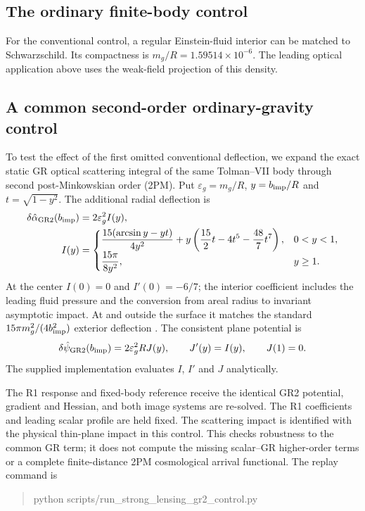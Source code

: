 \subsection{The ordinary finite-body control}
For the conventional control, a regular Einstein-fluid interior can be
matched to Schwarzschild. Its compactness is
$m_g/R=1.59514\times10^{-6}$.
The leading optical application above uses the weak-field projection of
this density.

\subsection{A common second-order ordinary-gravity control}
\label{sec:gr2-method}
To test the effect of the first omitted conventional deflection, we
expand the exact static GR optical scattering integral of the same
Tolman--VII body through second post-Minkowskian order (2PM).
Put $\varepsilon_g=m_g/R$, $y=b_{\rm imp}/R$ and
$t=\sqrt{1-y^2}$. The additional radial deflection is
\begin{align}
 \delta\hat\alpha_{\rm GR2}(b_{\rm imp})&=2\varepsilon_g^2 I(y),
 \label{eq:gr2-alpha}\\
 I(y)&=\begin{cases}
 \displaystyle\frac{15(\arcsin y-yt)}{4y^2}
 +y\left(\frac{15}{2}t-4t^5-\frac{48}{7}t^7\right),&0<y<1,\\[4pt]
 \displaystyle\frac{15\pi}{8y^2},&y\ge1.
 \end{cases}
 \label{eq:gr2-I}
\end{align}
At the center $I(0)=0$ and $I'(0)=-6/7$; the interior coefficient
includes the leading fluid pressure and the conversion from areal radius
to invariant asymptotic impact. At and outside the surface it matches the
standard $15\pi m_g^2/(4b_{\rm imp}^2)$ exterior deflection
\citep{IyerPetters2007}.
The consistent plane potential is
\begin{equation}
 \delta\hat\psi_{\rm GR2}(b_{\rm imp})
 =2\varepsilon_g^2R J(y),\qquad J'(y)=I(y),\qquad J(1)=0.
 \label{eq:gr2-potential}
\end{equation}
The supplied implementation evaluates $I$, $I'$ and $J$ analytically.

The R1 response and fixed-body reference receive the identical GR2 potential,
gradient and Hessian, and both image systems are re-solved. The R1
coefficients and leading scalar profile are held fixed. The scattering
impact is identified with the physical thin-plane impact in this control.
This checks robustness to the common GR term; it does not compute the
missing scalar--GR higher-order terms or a complete finite-distance 2PM
cosmological arrival functional. The replay command is
\begin{quote}\small\ttfamily\raggedright
python scripts/run\_strong\_lensing\_gr2\_control.py
\end{quote}

